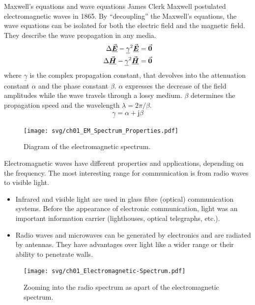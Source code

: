 \begin{refsection}
\begin{excursus}{Maxwell's equations and wave equations}
	James Clerk Maxwell postulated electromagnetic waves in 1865. By ``decoupling'' the Maxwell's equations, the wave equations can be isolated for both the electric field and the magnetic field. They describe the wave propagation in any media.
	\begin{subequations}
		\begin{align}
			\Delta \vec{\bm{\underline{E}}} - \underline{\gamma}^2 \vec{\bm{\underline{E}}} &= \vec{\bm{0}} \\
			\Delta \vec{\bm{\underline{H}}} - \underline{\gamma}^2 \vec{\bm{\underline{H}}} &= \vec{\bm{0}}
		\end{align}
	\end{subequations}
	where $\underline{\gamma}$ is the complex propagation constant, that devolves into the attenuation constant $\alpha$ and the phase constant $\beta$. $\alpha$ expresses the decrease of the field amplitudes while the wave travels through a lossy medium. $\beta$ determines the propagation speed and the wavelength $\lambda = 2 \pi / \beta$.
	\begin{equation}
		\underline{\gamma} = \alpha + \mathsf{j} \beta
	\end{equation}
\end{excursus}

\begin{figure}[H]
	\centering
	\texttt{[image: svg/ch01\_EM\_Spectrum\_Properties.pdf]}
	\caption[Diagram of the electromagnetic spectrum]{Diagram of the electromagnetic spectrum. }
\end{figure}

Electromagnetic waves have different properties and applications, depending on the frequency. The most interesting range for communication is from radio waves to visible light.
\begin{itemize}
	\item Infrared and visible light are used in glass fibre (optical) communication systems. Before the appearance of electronic communication, light was an important information carrier (lighthouses, optical telegraphs, etc.).
	\item Radio waves and microwaves can be generated by electronics and are radiated by antennas. They have advantages over light like a wider range or their ability to penetrate walls.
\end{itemize}

\begin{figure}[H]
	\centering
	\texttt{[image: svg/ch01\_Electromagnetic-Spectrum.pdf]}
	\caption[Zooming into the radio spectrum as apart of the electromagnetic spectrum]{Zooming into the radio spectrum as apart of the electromagnetic spectrum. }
\end{figure}


\end{refsection}
